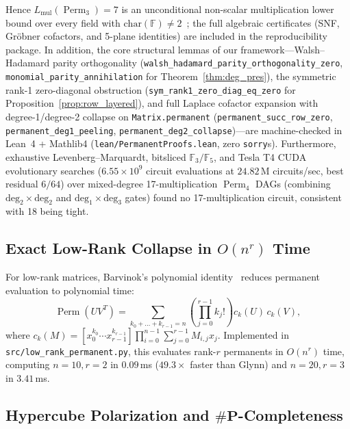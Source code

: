 \documentclass[11pt,a4paper]{article}
\newcommand{\Perm}{\operatorname{Perm}}
\newcommand{\F}{\mathbb{F}}
\begin{document}
{\sloppy
Hence $L_{\mathrm{mul}}(\Perm_3) = 7$ is an unconditional non-scalar multiplication lower bound over every field with $\mathrm{char}(\mathbb{F}) \neq 2$~\cite{bcs1997}; the full algebraic certificates (SNF, Gr\"obner cofactors, and 5-plane identities) are included in the reproducibility package. In addition, the core structural lemmas of our framework---Walsh--Hadamard parity orthogonality (\texttt{walsh\_\-hadamard\_\-parity\_\-orthogonality\_\-zero}, \texttt{monomial\_\-parity\_\-annihilation} for Theorem~\ref{thm:deg_pres}), the symmetric rank-1 zero-diagonal obstruction (\texttt{sym\_\-rank1\_\-zero\_\-diag\_\-eq\_\-zero} for Proposition~\ref{prop:row_layered}), and full Laplace cofactor expansion with degree-1/degree-2 collapse on \texttt{Matrix.permanent} (\texttt{permanent\_\-succ\_\-row\_\-zero}, \texttt{permanent\_\-deg1\_\-peeling}, \texttt{permanent\_\-deg2\_\-collapse})---are machine-checked in Lean~4 + Mathlib4 (\texttt{lean/PermanentProofs.lean}, zero \texttt{sorry}s). Furthermore, exhaustive Levenberg--Marquardt, bitsliced $\F_3/\F_5$, and Tesla T4 CUDA evolutionary searches ($6.55 \times 10^9$ circuit evaluations at $24.82$\,M circuits/sec, best residual $6/64$) over mixed-degree 17-multiplication $\Perm_4$ DAGs (combining $\mathrm{deg}_2 \times \mathrm{deg}_2$ and $\mathrm{deg}_1 \times \mathrm{deg}_3$ gates) found no 17-multiplication circuit, consistent with 18 being tight.\par
}

\subsection{Exact Low-Rank Collapse in $O(n^r)$ Time}

For low-rank matrices, Barvinok's polynomial identity~\cite{barvinok1996} reduces permanent evaluation to polynomial time:
\begin{equation}
\Perm(U V^T) = \sum_{k_0+\dots+k_{r-1}=n} \left(\prod_{j=0}^{r-1} k_j!\right) c_k(U)\, c_k(V),
\end{equation}
where $c_k(M) = [x_0^{k_0} \cdots x_{r-1}^{k_{r-1}}] \prod_{i=0}^{n-1} \sum_{j=0}^{r-1} M_{i,j} x_j$.
Implemented in \texttt{src/low\_rank\_permanent.py}, this evaluates rank-$r$ permanents in $O(n^r)$ time, computing $n=10, r=2$ in $0.09$\,ms ($49.3\times$ faster than Glynn) and $n=20, r=3$ in $3.41$\,ms.

\subsection{Hypercube Polarization and $\#\mathbf{P}$-Completeness}
\end{document}
